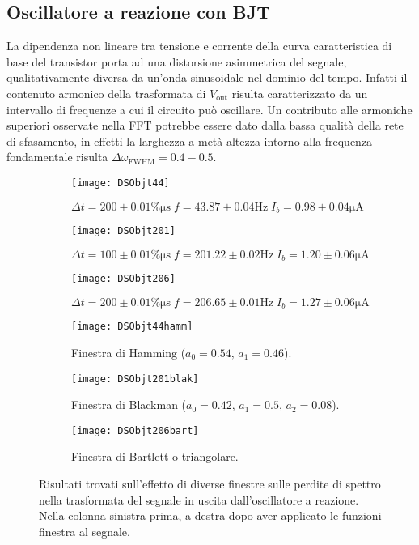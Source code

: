 \documentclass{article}[a4paper, oneside, 11pt]
\begin{document}
\subsection{Oscillatore a reazione con BJT}
La dipendenza non lineare tra tensione e corrente della curva caratteristica
di base del transistor porta ad una distorsione asimmetrica del segnale, 
qualitativamente diversa da un'onda sinusoidale nel dominio del tempo.
Infatti il contenuto armonico della trasformata di $V_{\text{out}}$ risulta
caratterizzato da un intervallo di frequenze a cui il circuito può
oscillare. Un contributo alle armoniche superiori osservate nella FFT
potrebbe essere dato dalla bassa qualità della rete di sfasamento,
in effetti la larghezza a metà altezza intorno alla frequenza
fondamentale risulta $\Delta \omega_{\text{FWHM}} = 0.4 - 0.5$. 
\begin{figure}[!htb]
\centering
	\begin{subfigure}{.5\textwidth}
	\texttt{[image: DSObjt44]}
	\caption{$\Delta t = 200 \pm 0.01 \% \si{\us} \; f = 43.87
	\pm 0.04 \si{\Hz} \; I_b = 0.98 \pm 0.04 \si{\uA}$}
	\texttt{[image: DSObjt201]}
	\caption{$\Delta t = 100 \pm 0.01 \% \si{\us} \; f = 201.22
	\pm 0.02 \si{\Hz} \; I_b = 1.20 \pm 0.06 \si{\uA}$}
	\texttt{[image: DSObjt206]}
	\caption{$\Delta t = 200 \pm 0.01 \% \si{\us} \; f = 206.65
	\pm 0.01 \si{\Hz} \; I_b = 1.27 \pm 0.06 \si{\uA}$}
\label{fig: BJTin}
	\end{subfigure}%
	\begin{subfigure}{.5\textwidth}
	\texttt{[image: DSObjt44hamm]}
	\caption{Finestra di Hamming ($a_0 = 0.54, \, a_1 = 0.46$).}
	\texttt{[image: DSObjt201blak]}
	\caption{Finestra di Blackman ($a_0 = 0.42, \, a_1 = 0.5, \, a_2 = 0.08$).}
	\texttt{[image: DSObjt206bart]}
	\caption{Finestra di Bartlett o triangolare.}
\label{fig: BJTwin}
	\end{subfigure}%
	\caption{Risultati trovati sull'effetto di diverse finestre	sulle
			perdite di spettro nella trasformata del segnale in uscita
		 	dall'oscillatore a reazione.
			Nella colonna sinistra prima, a destra dopo aver applicato
			le funzioni finestra al segnale. \label{fig: BJTall}}
\end{figure}
\end{document}
